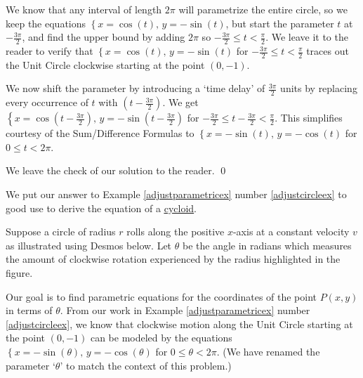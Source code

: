 \documentclass{ximera}
\begin{document}
\begin{example}
\begin{enumerate}
 

We know that any interval of length $2\pi$ will parametrize the entire circle, so we keep the equations $\left\{ x = \cos(t), \, y = -\sin(t) \right.$, but start the parameter $t$ at $-\frac{3\pi}{2}$, and find the upper bound by adding $2\pi$ so $-\frac{3\pi}{2} \leq t < \frac{\pi}{2}$.  We leave it to the reader to  verify that   $\left\{ x = \cos(t), \, y = -\sin(t) \right.$ for $-\frac{3\pi}{2} \leq t < \frac{\pi}{2}$ traces out the Unit Circle clockwise starting at the point $(0, -1)$.  

 

We now shift the parameter by introducing a `time delay' of $\frac{3\pi}{2}$ units by replacing every occurrence of $t$ with $\left(t - \frac{3\pi}{2}\right)$.  We get $\left\{ x = \cos\left(t - \frac{3\pi}{2}\right), \, y = -\sin\left(t - \frac{3\pi}{2}\right) \right.$ for  $-\frac{3\pi}{2} \leq t - \frac{3\pi}{2} < \frac{\pi}{2}$.  This simplifies courtesy of the Sum/Difference Formulas to $\left\{ x = -\sin(t), \, y = -\cos(t) \right.$ for $ 0 \leq t  < 2\pi$.

 

We leave the check of our solution to the reader.  \qed

\end{enumerate}

\end{example}

We put our answer to Example \ref{adjustparametricex} number \ref{adjustcircleex} to good use to derive the equation of a  \href{http://en.wikipedia.org/wiki/Cycloid}{\underline{cycloid}}. 

 

 Suppose a circle of radius $r$ rolls along the positive $x$-axis at a constant velocity $v$ as illustrated using Desmos below.  Let $\theta$ be the angle in radians which measures the amount of clockwise rotation experienced by the radius highlighted in the figure.  

\begin{center}
\end{center}

Our goal is to find parametric equations for the coordinates of the point $P(x,y)$ in terms of $\theta$.  From our work in Example \ref{adjustparametricex} number \ref{adjustcircleex}, we know that clockwise motion along the Unit Circle starting at the point $(0,-1)$ can be modeled by the equations  $\left\{ x = -\sin(\theta), \, y = -\cos(\theta) \right.$ for $0 \leq \theta < 2\pi$.  (We have renamed the parameter `$\theta$' to match the context of this problem.) 
\end{document}
